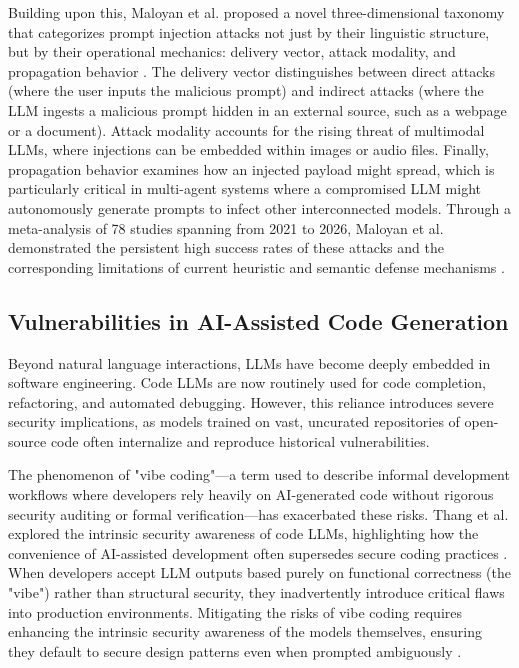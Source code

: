 \documentclass[11pt,a4paper]{article}
\begin{document}
Building upon this, Maloyan et al. proposed a novel three-dimensional taxonomy that categorizes prompt injection attacks not just by their linguistic structure, but by their operational mechanics: delivery vector, attack modality, and propagation behavior \cite{Maloyan_2026_Prompt}. The delivery vector distinguishes between direct attacks (where the user inputs the malicious prompt) and indirect attacks (where the LLM ingests a malicious prompt hidden in an external source, such as a webpage or a document). Attack modality accounts for the rising threat of multimodal LLMs, where injections can be embedded within images or audio files. Finally, propagation behavior examines how an injected payload might spread, which is particularly critical in multi-agent systems where a compromised LLM might autonomously generate prompts to infect other interconnected models. Through a meta-analysis of 78 studies spanning from 2021 to 2026, Maloyan et al. demonstrated the persistent high success rates of these attacks and the corresponding limitations of current heuristic and semantic defense mechanisms \cite{Maloyan_2026_Prompt}.

\subsection{Vulnerabilities in AI-Assisted Code Generation}

Beyond natural language interactions, LLMs have become deeply embedded in software engineering. Code LLMs are now routinely used for code completion, refactoring, and automated debugging. However, this reliance introduces severe security implications, as models trained on vast, uncurated repositories of open-source code often internalize and reproduce historical vulnerabilities. 

The phenomenon of "vibe coding"---a term used to describe informal development workflows where developers rely heavily on AI-generated code without rigorous security auditing or formal verification---has exacerbated these risks. Thang et al. explored the intrinsic security awareness of code LLMs, highlighting how the convenience of AI-assisted development often supersedes secure coding practices \cite{Thang_2026_LLM}. When developers accept LLM outputs based purely on functional correctness (the "vibe") rather than structural security, they inadvertently introduce critical flaws into production environments. Mitigating the risks of vibe coding requires enhancing the intrinsic security awareness of the models themselves, ensuring they default to secure design patterns even when prompted ambiguously \cite{Thang_2026_LLM}.
\end{document}
